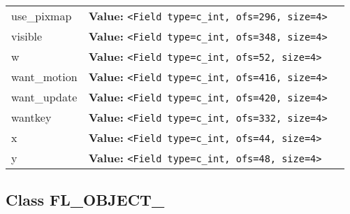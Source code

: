 \begin{longtable}{|p{\varnamewidth}|p{\vardescrwidth}|l}
\cline{1-2}
\raggedright u\-s\-e\-\_\-p\-i\-x\-m\-a\-p\- & \raggedright \textbf{Value:} 
{\tt {\textless}Field type=c\_int, ofs=296, size=4{\textgreater}}&\\
\cline{1-2}
\raggedright v\-i\-s\-i\-b\-l\-e\- & \raggedright \textbf{Value:} 
{\tt {\textless}Field type=c\_int, ofs=348, size=4{\textgreater}}&\\
\cline{1-2}
\raggedright w\- & \raggedright \textbf{Value:} 
{\tt {\textless}Field type=c\_int, ofs=52, size=4{\textgreater}}&\\
\cline{1-2}
\raggedright w\-a\-n\-t\-\_\-m\-o\-t\-i\-o\-n\- & \raggedright \textbf{Value:} 
{\tt {\textless}Field type=c\_int, ofs=416, size=4{\textgreater}}&\\
\cline{1-2}
\raggedright w\-a\-n\-t\-\_\-u\-p\-d\-a\-t\-e\- & \raggedright \textbf{Value:} 
{\tt {\textless}Field type=c\_int, ofs=420, size=4{\textgreater}}&\\
\cline{1-2}
\raggedright w\-a\-n\-t\-k\-e\-y\- & \raggedright \textbf{Value:} 
{\tt {\textless}Field type=c\_int, ofs=332, size=4{\textgreater}}&\\
\cline{1-2}
\raggedright x\- & \raggedright \textbf{Value:} 
{\tt {\textless}Field type=c\_int, ofs=44, size=4{\textgreater}}&\\
\cline{1-2}
\raggedright y\- & \raggedright \textbf{Value:} 
{\tt {\textless}Field type=c\_int, ofs=48, size=4{\textgreater}}&\\
\cline{1-2}
\end{longtable}



\subsection{Class FL\_OBJECT\_}

